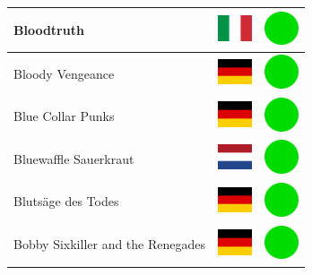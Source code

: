 \documentclass[12pt, a4paper, twoside]{report}
\begin{document}
\begin{center}
\begin{longtable}{|p{5cm}|p{2cm}|p{2cm}|}
 Bloodtruth                                                 & \includegraphics[width=1cm]{../img/flags/it} &   \includegraphics[width=1cm]{../likes/y} \\ \hline
 Bloody Vengeance                                           & \includegraphics[width=1cm]{../img/flags/de} &   \includegraphics[width=1cm]{../likes/y} \\ \hline
 Blue Collar Punks                                          & \includegraphics[width=1cm]{../img/flags/de} &   \includegraphics[width=1cm]{../likes/y} \\ \hline
 Bluewaffle Sauerkraut                                      & \includegraphics[width=1cm]{../img/flags/nl} &   \includegraphics[width=1cm]{../likes/y} \\ \hline
 Blutsäge des Todes                                         & \includegraphics[width=1cm]{../img/flags/de} &   \includegraphics[width=1cm]{../likes/y} \\ \hline
 Bobby Sixkiller and the Renegades                          & \includegraphics[width=1cm]{../img/flags/de} &   \includegraphics[width=1cm]{../likes/y} \\ \hline

\end{longtable}
\end{center}
\end{document}

